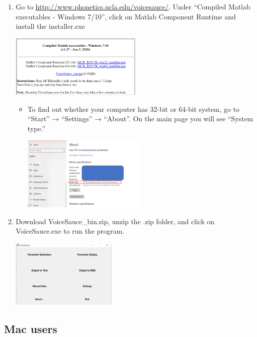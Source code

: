 \documentclass[
]{article}
\providecommand{\tightlist}{%
  \setlength{\itemsep}{0pt}\setlength{\parskip}{0pt}}
\begin{document}
\begin{enumerate}
\def\labelenumi{\arabic{enumi}.}
\tightlist
\item
  Go to \url{http://www.phonetics.ucla.edu/voicesauce/}. Under
  ``Compiled Matlab executables - Windows 7/10'', click on Matlab
  Component Runtime and install the installer.exe

  \includegraphics[width=0.5\textwidth,height=\textheight]{image/vs_windows_install_page.png}

  \begin{itemize}
  \tightlist
  \item
    To find out whether your computer has 32-bit or 64-bit system, go to
    ``Start'' → ``Settings'' → ``About''. On the main page you will see
    ``System type.''

    \includegraphics[width=0.5\textwidth,height=\textheight]{image/vs_system_type.png}
  \end{itemize}
\item
  Download VoiceSauce\_bin.zip, unzip the .zip folder, and click on
  VoiceSauce.exe to run the program.

  \includegraphics[width=0.4\textwidth,height=\textheight]{image/vs_windows_interface.png}
\end{enumerate}

\hypertarget{mac-users}{%
\subsection{Mac users}\label{mac-users}}
\end{document}
